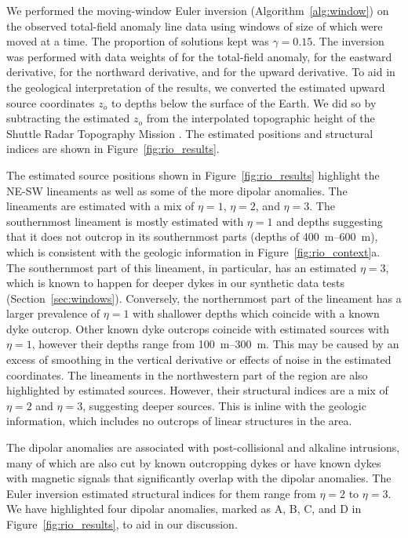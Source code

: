 We performed the moving-window Euler inversion (Algorithm~\ref{alg:window}) on the observed total-field anomaly line data using windows of size of \RioWindowSize{} which were moved \RioWindowStep{} at a time.
The proportion of solutions kept was $\gamma=0.15$.
The inversion was performed with data weights of \RioWeightsF{} for the total-field anomaly, \RioWeightsE{} for the eastward derivative, \RioWeightsN{} for the northward derivative, and \RioWeightsU{} for the upward derivative.
To aid in the geological interpretation of the results, we converted the estimated upward source coordinates $z_o$ to depths below the surface of the Earth.
We did so by subtracting the estimated $z_o$ from the interpolated topographic height of the Shuttle Radar Topography Mission \citep[SRTM;][]{SRTM}.
The estimated positions and structural indices are shown in Figure~\ref{fig:rio_results}.

The estimated source positions shown in Figure~\ref{fig:rio_results} highlight the NE-SW lineaments as well as some of the more dipolar anomalies.
The lineaments are estimated with a mix of $\eta=1$, $\eta=2$, and $\eta=3$.
The southernmost lineament is mostly estimated with $\eta=1$ and depths suggesting that it does not outcrop in its southernmost parts (depths of \qtyrange{400}{600}{\m}), which is consistent with the geologic information in Figure~\ref{fig:rio_context}a.
The southernmost part of this lineament, in particular, has an estimated $\eta=3$, which is known to happen for deeper dykes in our synthetic data tests (Section~\ref{sec:windows}).
Conversely, the northernmost part of the lineament has a larger prevalence of $\eta=1$ with shallower depths which coincide with a known dyke outcrop.
Other known dyke outcrops coincide with estimated sources with $\eta=1$, however their depths range from \qtyrange{100}{300}{\m}.
This may be caused by an excess of smoothing in the vertical derivative or effects of noise in the estimated coordinates.
The lineaments in the northwestern part of the region are also highlighted by estimated sources.
However, their structural indices are a mix of $\eta=2$ and $\eta=3$, suggesting deeper sources.
This is inline with the geologic information, which includes no outcrops of linear structures in the area.

The dipolar anomalies are associated with post-collisional and alkaline intrusions, many of which are also cut by known outcropping dykes or have known dykes with magnetic signals that significantly overlap with the dipolar anomalies.
The Euler inversion estimated structural indices for them range from $\eta=2$ to $\eta=3$.
We have highlighted four dipolar anomalies, marked as A, B, C, and D in Figure~\ref{fig:rio_results}, to aid in our discussion.

